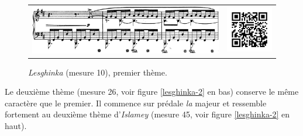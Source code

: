 \begin{figure}[!ht]
  \begin{bigcenter}
    \begin{tabular}{lr}
      \includegraphics[width=12.5cm, keepaspectratio]{lesghinka-theme1.png}
      &
      \includegraphics[width=3cm, keepaspectratio]{op11-qr.png}
    \end{tabular}
  \end{bigcenter}
  \caption{\label{lesghinka-1}\emph{Lesghinka} (mesure 10), premier thème.}
\end{figure}

Le deuxième thème (mesure 26, voir figure \ref{lesghinka-2} en bas) conserve le même caractère que le premier. Il commence sur prédale \emph{la} majeur et ressemble fortement au deuxième thème d'\emph{Islamey} (mesure 45, voir figure \ref{lesghinka-2} en haut).


